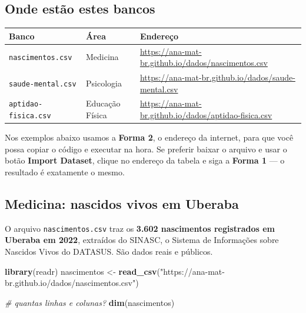 \documentclass[
]{book}
\newenvironment{Shaded}{\begin{snugshade}}{\end{snugshade}}
\newcommand{\CommentTok}[1]{\textcolor[rgb]{0.56,0.35,0.01}{\textit{#1}}}
\newcommand{\FunctionTok}[1]{\textcolor[rgb]{0.13,0.29,0.53}{\textbf{#1}}}
\newcommand{\NormalTok}[1]{#1}
\newcommand{\OtherTok}[1]{\textcolor[rgb]{0.56,0.35,0.01}{#1}}
\newcommand{\StringTok}[1]{\textcolor[rgb]{0.31,0.60,0.02}{#1}}
\newcounter{none} %
\begin{document}
\subsection{Onde estão estes bancos}\label{onde-estuxe3o-estes-bancos}

{\def\LTcaptype{none} %
\begin{longtable}[]{@{}
  >{\raggedright\arraybackslash}p{}
  >{\raggedright\arraybackslash}p{}
  >{\raggedright\arraybackslash}p{}@{}}
\toprule\noalign{}
\begin{minipage}[b]{\linewidth}\raggedright
Banco
\end{minipage} & \begin{minipage}[b]{\linewidth}\raggedright
Área
\end{minipage} & \begin{minipage}[b]{\linewidth}\raggedright
Endereço
\end{minipage} \\
\midrule\noalign{}
\endhead
\bottomrule\noalign{}
\endlastfoot
\texttt{nascimentos.csv} & Medicina & \url{https://ana-mat-br.github.io/dados/nascimentos.csv} \\
\texttt{saude-mental.csv} & Psicologia & \url{https://ana-mat-br.github.io/dados/saude-mental.csv} \\
\texttt{aptidao-fisica.csv} & Educação Física & \url{https://ana-mat-br.github.io/dados/aptidao-fisica.csv} \\
\end{longtable}
}

Nos exemplos abaixo usamos a \textbf{Forma 2}, o endereço da internet, para que você possa copiar o código e executar na hora. Se preferir baixar o arquivo e usar o botão \textbf{Import Dataset}, clique no endereço da tabela e siga a \textbf{Forma 1} --- o resultado é exatamente o mesmo.

\subsection{Medicina: nascidos vivos em Uberaba}\label{medicina-nascidos-vivos-em-uberaba}

O arquivo \texttt{nascimentos.csv} traz os \textbf{3.602 nascimentos registrados em Uberaba em 2022}, extraídos do SINASC, o Sistema de Informações sobre Nascidos Vivos do DATASUS. São dados reais e públicos.

\begin{Shaded}
\begin{Highlighting}[]
\FunctionTok{library}\NormalTok{(readr)}
\NormalTok{nascimentos }\OtherTok{\textless{}{-}} \FunctionTok{read\_csv}\NormalTok{(}\StringTok{"https://ana{-}mat{-}br.github.io/dados/nascimentos.csv"}\NormalTok{)}

\CommentTok{\# quantas linhas e colunas?}
\FunctionTok{dim}\NormalTok{(nascimentos)}
\end{Highlighting}
\end{Shaded}
\end{document}
